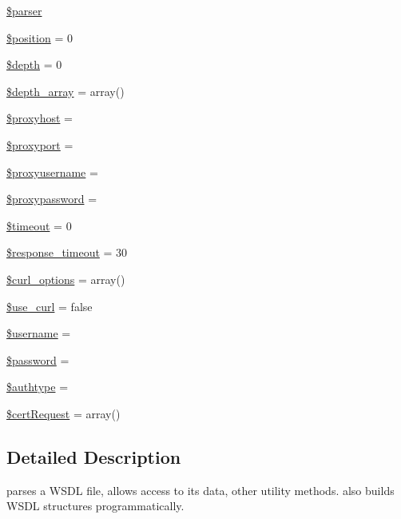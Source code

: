 \begin{DoxyCompactItemize}
\item 
\hyperlink{classwsdl_a147a766daa03d52576c7345fea31c945}{\$parser}
\item 
\hyperlink{classwsdl_a6e88dcb746884d18f6c89eb9b9c14a42}{\$position} = 0
\item 
\hyperlink{classwsdl_a0abb04e6a8a04e161eb4657f54848b18}{\$depth} = 0
\item 
\hyperlink{classwsdl_aaaa53c3e91636edd41a46e767abb3347}{\$depth\+\_\+array} = array()
\item 
\hyperlink{classwsdl_a54407bcc777ac313a172561a8ff976c6}{\$proxyhost} = \textquotesingle{}\textquotesingle{}
\item 
\hyperlink{classwsdl_ac396538deee1152f84f9ddabac2c2366}{\$proxyport} = \textquotesingle{}\textquotesingle{}
\item 
\hyperlink{classwsdl_aaa30711a40f8f7bae4cd7060414e0fe1}{\$proxyusername} = \textquotesingle{}\textquotesingle{}
\item 
\hyperlink{classwsdl_a98c0d3b74811ee643f7d1fce47f1b281}{\$proxypassword} = \textquotesingle{}\textquotesingle{}
\item 
\hyperlink{classwsdl_a84320a9bf3e591d7ae20dfcb0dfe6a0d}{\$timeout} = 0
\item 
\hyperlink{classwsdl_a17a3280264a8b9bb5ed32729d654739c}{\$response\+\_\+timeout} = 30
\item 
\hyperlink{classwsdl_a6f996237d5484e4538b2adf56de893e6}{\$curl\+\_\+options} = array()
\item 
\hyperlink{classwsdl_a372c0672391a16e4902e172ea3a0ae63}{\$use\+\_\+curl} = false
\item 
\hyperlink{classwsdl_a0eb82aa5f81cf845de4b36cd653c42cf}{\$username} = \textquotesingle{}\textquotesingle{}
\item 
\hyperlink{classwsdl_a607686ef9f99ea7c42f4f3dd3dbb2b0d}{\$password} = \textquotesingle{}\textquotesingle{}
\item 
\hyperlink{classwsdl_ae81871b02c5845eb3a1071eb24e1f29c}{\$authtype} = \textquotesingle{}\textquotesingle{}
\item 
\hyperlink{classwsdl_adcbe9a77644bad97ed599d1651bd2719}{\$cert\+Request} = array()
\end{DoxyCompactItemize}


\subsection{Detailed Description}
parses a W\+S\+D\+L file, allows access to it\textquotesingle{}s data, other utility methods. also builds W\+S\+D\+L structures programmatically.

